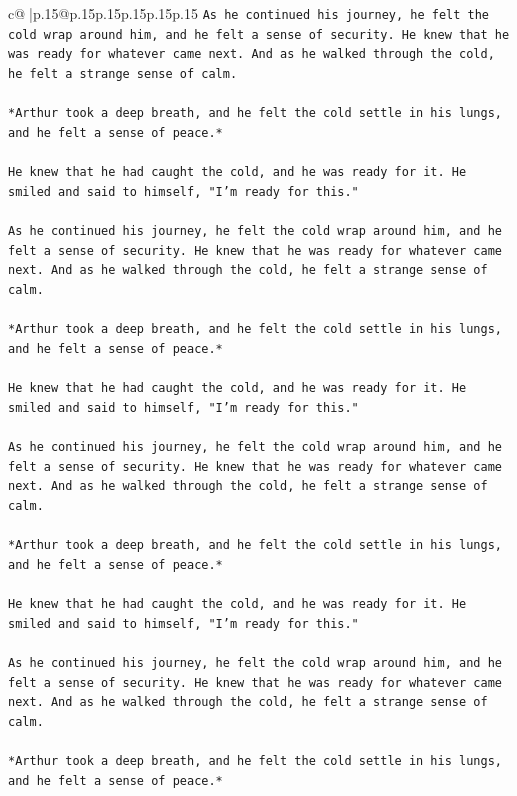 \documentclass{article}
\begin{document}
{\begin{supertabular}{c@{$\;$}|p{.15\linewidth}@{}p{.15\linewidth}p{.15\linewidth}p{.15\linewidth}p{.15\linewidth}p{.15\linewidth}}
{{{\texttt{As he continued his journey, he felt the cold wrap around him, and he felt a sense of security. He knew that he was ready for whatever came next. And as he walked through the cold, he felt a strange sense of calm.} \\
\\ 
\texttt{*Arthur took a deep breath, and he felt the cold settle in his lungs, and he felt a sense of peace.*} \\
\\ 
\texttt{He knew that he had caught the cold, and he was ready for it. He smiled and said to himself, "I'm ready for this."} \\
\\ 
\texttt{As he continued his journey, he felt the cold wrap around him, and he felt a sense of security. He knew that he was ready for whatever came next. And as he walked through the cold, he felt a strange sense of calm.} \\
\\ 
\texttt{*Arthur took a deep breath, and he felt the cold settle in his lungs, and he felt a sense of peace.*} \\
\\ 
\texttt{He knew that he had caught the cold, and he was ready for it. He smiled and said to himself, "I'm ready for this."} \\
\\ 
\texttt{As he continued his journey, he felt the cold wrap around him, and he felt a sense of security. He knew that he was ready for whatever came next. And as he walked through the cold, he felt a strange sense of calm.} \\
\\ 
\texttt{*Arthur took a deep breath, and he felt the cold settle in his lungs, and he felt a sense of peace.*} \\
\\ 
\texttt{He knew that he had caught the cold, and he was ready for it. He smiled and said to himself, "I'm ready for this."} \\
\\ 
\texttt{As he continued his journey, he felt the cold wrap around him, and he felt a sense of security. He knew that he was ready for whatever came next. And as he walked through the cold, he felt a strange sense of calm.} \\
\\ 
\texttt{*Arthur took a deep breath, and he felt the cold settle in his lungs, and he felt a sense of peace.*} \\
}}}
\end{supertabular}}
\end{document}
